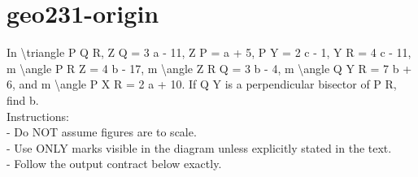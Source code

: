 \documentclass[12pt]{article}
\begin{document}
\bigskip
\section*{geo231-origin}
\noindent\begin{minipage}{\textwidth}
\setlength{\parskip}{4pt}
In \textbackslash{}triangle P Q R, Z Q = 3 a - 11, Z P = a + 5, P Y = 2 c - 1, Y R = 4 c - 11, m \textbackslash{}angle P R Z = 4 b - 17, m \textbackslash{}angle Z R Q = 3 b - 4, m \textbackslash{}angle Q Y R = 7 b + 6, and m \textbackslash{}angle P X R = 2 a + 10. If Q Y is a perpendicular bisector of P R, find b.\\
Instructions:\\
- Do NOT assume figures are to scale.\\
- Use ONLY marks visible in the diagram unless explicitly stated in the text.\\
- Follow the output contract below exactly.\\
\end{minipage}
\end{document}
